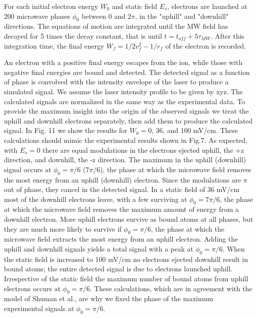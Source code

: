 \documentclass[aps,pra,preprint,groupedaddress]{revtex4-1}
\begin{document}
For each initial electron energy $W_0$ and static field $E_s$, electrons are launched at 200 microwave phases $\phi_0$ between 0 and $2\pi$, in the "uphill" and "downhill" directions. The equations of motion are integrated until the MW field has decayed for 5 times the decay constant, that is until  $t=t_{off} + 5\tau_{MW}$. After this integration time, the final energy $W_f = 1/2 v_f^2 - 1/r_f$ of the electron is recorded.

An electron with a positive final energy escapes from the ion, while those with negative final energies are bound and detected. The detected signal as a function of phase is convolved with the intensity envelope of the laser to produce a simulated signal. We assume the laser intensity profile to be given by xyz. The calculated signals are normalized in the same way as the experimental data. To provide the maximum insight into the origin of the observed signals we treat the uphill and downhill electrons separately, then add them to produce the calculated signal. 
In Fig. 11 we show the results for $W_0=$0, 36, and 100 mV/cm. These calculations should mimic the experimental results shown in Fig.7. As expected, with $E_s=0$ there are equal modulations in the electrons ejected uphill, the +z direction, and downhill, the -z direction. The maximum in the uphill (downhill) signal occurs at $\phi_0=\pi/6$ ($7\pi/6$), the phase at which the microwave field removes the most energy from an uphill (downhill) electron. Since the modulations are $\pi$ out of phase, they cancel in the detected signal. In a static field of 36 mV/cm most of the downhill electrons leave, with a few surviving at $\phi_0=7\pi/6$, the phase at which the microwave field removes the maximum amount of energy from a downhill electron. More uphill electrons survive as bound atoms at all phases, but they are much more likely to survive if $\phi_0=\pi/6$, the phase at which the microwave field extracts the most energy from an uphill electron. Adding the uphill and downhill signals yields a total signal with a peak at $\phi_0=\pi/6$. When the static field is increased to 100 mV/cm no electrons ejected downhill result in bound atoms; the entire detected signal is due to electrons launched uphill. Irrespective of the static field the maximum number of bound atoms from uphill electrons occurs at $\phi_0=\pi/6$. These calculations, which are in agreement with the model of Shuman et al., are why we fixed the phase of the maximum experimental signals at $\phi_0=\pi/6$.
\end{document}
